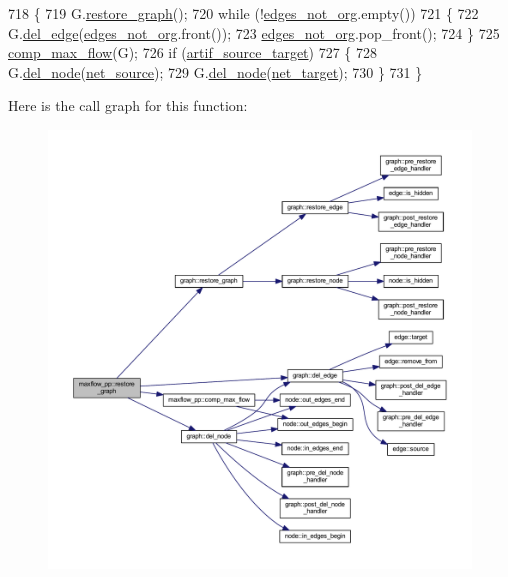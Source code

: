 \begin{DoxyCode}
718 \{
719     G.\mbox{\hyperlink{classgraph_a53e2a5505fa6427587e12d66e4a86cec}{restore\_graph}}();
720     \textcolor{keywordflow}{while} (!\mbox{\hyperlink{classmaxflow__pp_ad2cae6d52735a83abc830ce518843a31}{edges\_not\_org}}.empty())
721     \{
722     G.\mbox{\hyperlink{classgraph_ad9356508c49c542dfd4b7169297387c6}{del\_edge}}(\mbox{\hyperlink{classmaxflow__pp_ad2cae6d52735a83abc830ce518843a31}{edges\_not\_org}}.front());
723     \mbox{\hyperlink{classmaxflow__pp_ad2cae6d52735a83abc830ce518843a31}{edges\_not\_org}}.pop\_front();
724     \}
725     \mbox{\hyperlink{classmaxflow__pp_a6a8a301739757493318b1abfbed2698b}{comp\_max\_flow}}(G);
726     \textcolor{keywordflow}{if} (\mbox{\hyperlink{classmaxflow__pp_a21263af726420d377e404d816f31ed45}{artif\_source\_target}})
727     \{
728     G.\mbox{\hyperlink{classgraph_a8bdc09d5b9ac4bd26586b054d8fcbe91}{del\_node}}(\mbox{\hyperlink{classmaxflow__pp_a20f2d05465acc2d7b777ea8025d12003}{net\_source}});
729     G.\mbox{\hyperlink{classgraph_a8bdc09d5b9ac4bd26586b054d8fcbe91}{del\_node}}(\mbox{\hyperlink{classmaxflow__pp_a10f0b047011e04cb4816a824da5b7892}{net\_target}});
730     \}
731 \}
\end{DoxyCode}
Here is the call graph for this function\+:\nopagebreak
\begin{figure}[H]
\begin{center}
\leavevmode
\includegraphics[width=350pt]{classmaxflow__pp_a273cc9bde3aeb47c08223da7458ed29d_cgraph}
\end{center}
\end{figure}
